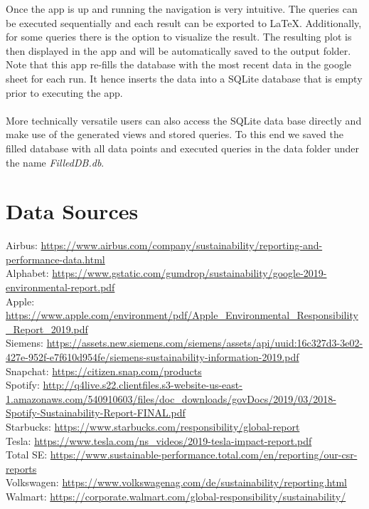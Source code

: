 Once the app is up and running the navigation is very intuitive.
The queries can be executed sequentially and each result can be exported to LaTeX.
Additionally, for some queries there is the option to visualize the result.
The resulting plot is then displayed in the app and will be automatically saved to the output folder.
Note that this app re-fills the database with the most recent data in the google sheet for each run.
It hence inserts the data into a SQLite database that is empty prior to executing the app. \\
\hfill \\
More technically versatile users can also access the SQLite data base directly and make use of the generated views and
stored queries.
To this end we saved the filled database with all data points and executed queries in the data folder under the name
\textit{FilledDB.db}.


\section*{Data Sources}

Airbus: \url{https://www.airbus.com/company/sustainability/reporting-and-performance-data.html} \\
Alphabet: \url{https://www.gstatic.com/gumdrop/sustainability/google-2019-environmental-report.pdf} \\
Apple: \url{https://www.apple.com/environment/pdf/Apple_Environmental_Responsibility_Report_2019.pdf} \\
Siemens: \url{https://assets.new.siemens.com/siemens/assets/api/uuid:16c327d3-3e02-427e-952f-e7f610d954fe/siemens-sustainability-information-2019.pdf} \\
Snapchat: \url{https://citizen.snap.com/products} \\
Spotify: \url{http://q4live.s22.clientfiles.s3-website-us-east-1.amazonaws.com/540910603/files/doc_downloads/govDocs/2019/03/2018-Spotify-Sustainability-Report-FINAL.pdf} \\
Starbucks: \url{https://www.starbucks.com/responsibility/global-report} \\
Tesla: \url{https://www.tesla.com/ns_videos/2019-tesla-impact-report.pdf} \\
Total SE: \url{https://www.sustainable-performance.total.com/en/reporting/our-csr-reports} \\
Volkswagen: \url{https://www.volkswagenag.com/de/sustainability/reporting.html} \\
Walmart: \url{https://corporate.walmart.com/global-responsibility/sustainability/} \\

